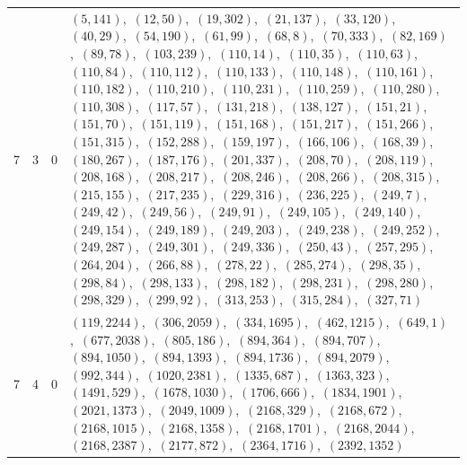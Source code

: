 \documentclass[11pt]{article}
\begin{document}
\begin{longtable}{@{}rrl>{\raggedright\arraybackslash}p{}@{}}
7 & 3 & $0$ & $(5,141)$,\allowbreak\ $(12,50)$,\allowbreak\ $(19,302)$,\allowbreak\ $(21,137)$,\allowbreak\ $(33,120)$,\allowbreak\ $(40,29)$,\allowbreak\ $(54,190)$,\allowbreak\ $(61,99)$,\allowbreak\ $(68,8)$,\allowbreak\ $(70,333)$,\allowbreak\ $(82,169)$,\allowbreak\ $(89,78)$,\allowbreak\ $(103,239)$,\allowbreak\ $(110,14)$,\allowbreak\ $(110,35)$,\allowbreak\ $(110,63)$,\allowbreak\ $(110,84)$,\allowbreak\ $(110,112)$,\allowbreak\ $(110,133)$,\allowbreak\ $(110,148)$,\allowbreak\ $(110,161)$,\allowbreak\ $(110,182)$,\allowbreak\ $(110,210)$,\allowbreak\ $(110,231)$,\allowbreak\ $(110,259)$,\allowbreak\ $(110,280)$,\allowbreak\ $(110,308)$,\allowbreak\ $(117,57)$,\allowbreak\ $(131,218)$,\allowbreak\ $(138,127)$,\allowbreak\ $(151,21)$,\allowbreak\ $(151,70)$,\allowbreak\ $(151,119)$,\allowbreak\ $(151,168)$,\allowbreak\ $(151,217)$,\allowbreak\ $(151,266)$,\allowbreak\ $(151,315)$,\allowbreak\ $(152,288)$,\allowbreak\ $(159,197)$,\allowbreak\ $(166,106)$,\allowbreak\ $(168,39)$,\allowbreak\ $(180,267)$,\allowbreak\ $(187,176)$,\allowbreak\ $(201,337)$,\allowbreak\ $(208,70)$,\allowbreak\ $(208,119)$,\allowbreak\ $(208,168)$,\allowbreak\ $(208,217)$,\allowbreak\ $(208,246)$,\allowbreak\ $(208,266)$,\allowbreak\ $(208,315)$,\allowbreak\ $(215,155)$,\allowbreak\ $(217,235)$,\allowbreak\ $(229,316)$,\allowbreak\ $(236,225)$,\allowbreak\ $(249,7)$,\allowbreak\ $(249,42)$,\allowbreak\ $(249,56)$,\allowbreak\ $(249,91)$,\allowbreak\ $(249,105)$,\allowbreak\ $(249,140)$,\allowbreak\ $(249,154)$,\allowbreak\ $(249,189)$,\allowbreak\ $(249,203)$,\allowbreak\ $(249,238)$,\allowbreak\ $(249,252)$,\allowbreak\ $(249,287)$,\allowbreak\ $(249,301)$,\allowbreak\ $(249,336)$,\allowbreak\ $(250,43)$,\allowbreak\ $(257,295)$,\allowbreak\ $(264,204)$,\allowbreak\ $(266,88)$,\allowbreak\ $(278,22)$,\allowbreak\ $(285,274)$,\allowbreak\ $(298,35)$,\allowbreak\ $(298,84)$,\allowbreak\ $(298,133)$,\allowbreak\ $(298,182)$,\allowbreak\ $(298,231)$,\allowbreak\ $(298,280)$,\allowbreak\ $(298,329)$,\allowbreak\ $(299,92)$,\allowbreak\ $(313,253)$,\allowbreak\ $(315,284)$,\allowbreak\ $(327,71)$\\
7 & 4 & $0$ & $(119,2244)$,\allowbreak\ $(306,2059)$,\allowbreak\ $(334,1695)$,\allowbreak\ $(462,1215)$,\allowbreak\ $(649,1)$,\allowbreak\ $(677,2038)$,\allowbreak\ $(805,186)$,\allowbreak\ $(894,364)$,\allowbreak\ $(894,707)$,\allowbreak\ $(894,1050)$,\allowbreak\ $(894,1393)$,\allowbreak\ $(894,1736)$,\allowbreak\ $(894,2079)$,\allowbreak\ $(992,344)$,\allowbreak\ $(1020,2381)$,\allowbreak\ $(1335,687)$,\allowbreak\ $(1363,323)$,\allowbreak\ $(1491,529)$,\allowbreak\ $(1678,1030)$,\allowbreak\ $(1706,666)$,\allowbreak\ $(1834,1901)$,\allowbreak\ $(2021,1373)$,\allowbreak\ $(2049,1009)$,\allowbreak\ $(2168,329)$,\allowbreak\ $(2168,672)$,\allowbreak\ $(2168,1015)$,\allowbreak\ $(2168,1358)$,\allowbreak\ $(2168,1701)$,\allowbreak\ $(2168,2044)$,\allowbreak\ $(2168,2387)$,\allowbreak\ $(2177,872)$,\allowbreak\ $(2364,1716)$,\allowbreak\ $(2392,1352)$\\

\end{longtable}
\end{document}
